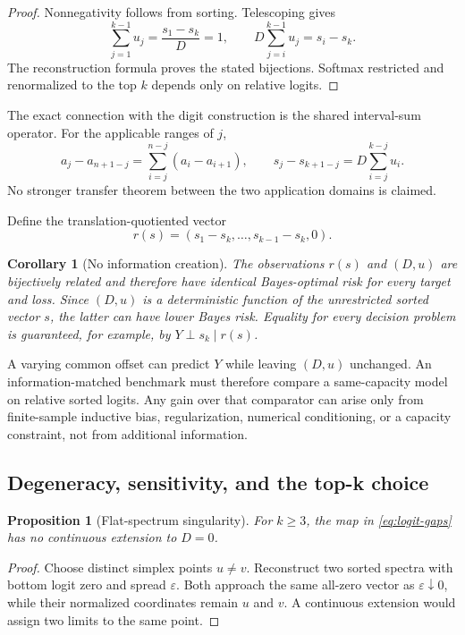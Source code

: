 \documentclass[11pt]{article}
\newtheorem{proposition}[theorem]{Proposition}
\newtheorem{corollary}[theorem]{Corollary}
\theoremstyle{definition}
\theoremstyle{remark}
\newcommand{\1}{\mathbf{1}}
\begin{document}
\begin{proof}
Nonnegativity follows from sorting.  Telescoping gives
\[
 \sum_{j=1}^{k-1}u_j
 =\frac{s_1-s_k}{D}=1,
 \qquad
 D\sum_{j=i}^{k-1}u_j=s_i-s_k.
\]
The reconstruction formula proves the stated bijections.  Softmax restricted
and renormalized to the top $k$ depends only on relative logits.
\end{proof}

The exact connection with the digit construction is the shared interval-sum
operator.  For the applicable ranges of $j$,
\[
 a_j-a_{n+1-j}=\sum_{i=j}^{n-j}(a_i-a_{i+1}),
 \qquad
 s_j-s_{k+1-j}=D\sum_{i=j}^{k-j}u_i.
\]
No stronger transfer theorem between the two application domains is claimed.

Define the translation-quotiented vector
\[
  r(s)=(s_1-s_k,\ldots,s_{k-1}-s_k,0).
\]

\begin{corollary}[No information creation]\label{cor:no-information}
The observations $r(s)$ and $(D,u)$ are bijectively related and therefore have
identical Bayes-optimal risk for every target and loss.  Since $(D,u)$ is a
deterministic function of the unrestricted sorted vector $s$, the latter can
have lower Bayes risk.  Equality for every decision problem is guaranteed, for
example, by $Y\perp s_k\mid r(s)$.
\end{corollary}

A varying common offset can predict $Y$ while leaving $(D,u)$ unchanged.  An
information-matched benchmark must therefore compare a same-capacity model on
relative sorted logits.  Any gain over that comparator can arise only from
finite-sample inductive bias, regularization, numerical conditioning, or a
capacity constraint, not from additional information.

\subsection{Degeneracy, sensitivity, and the top-k choice}

\begin{proposition}[Flat-spectrum singularity]
For $k\geq3$, the map in \eqref{eq:logit-gaps} has no continuous extension to
$D=0$.
\end{proposition}

\begin{proof}
Choose distinct simplex points $u\neq v$.  Reconstruct two sorted spectra with
bottom logit zero and spread $\varepsilon$.  Both approach the same all-zero
vector as $\varepsilon\downarrow0$, while their normalized coordinates remain
$u$ and $v$.  A continuous extension would assign two limits to the same
point.
\end{proof}
\end{document}
